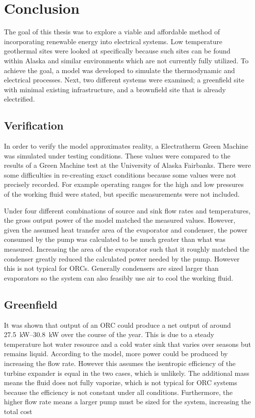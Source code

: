 \chapter{Conclusion}
\label{ch:conclusion}

The goal of this thesis was to explore a viable and affordable method of incorporating renewable energy into electrical systems. Low temperature geothermal sites were looked at specifically because such sites can be found within Alaska and similar environments which are not currently fully utilized. To achieve the goal, a model was developed to simulate the thermodynamic and electrical processes. Next, two different systems were examined; a greenfield site with minimal existing infrastructure, and a brownfield site that is already electrified. 

\section{Verification}
In order to verify the model approximates reality, a Electratherm Green Machine was simulated under testing conditions. These values were compared to the results of a Green Machine test at the University of Alaska Fairbanks. There were some difficulties in re-creating exact conditions because some values were not precisely recorded. For example operating ranges for the high and low pressures of the working fluid were stated, but specific measurements were not included.

Under four different combinations of source and sink flow rates and temperatures, the gross output power of the model matched the measured values. However, given the assumed heat transfer area of the evaporator and condenser, the power consumed by the pump was calculated to be much greater than what was measured. Increasing the area of the evaporator such that it roughly matched the condenser greatly reduced the calculated power needed by the pump. However this is not typical for ORCs. Generally condensers are sized larger than evaporators so the system can also feasibly use air to cool the working fluid. 

\section{Greenfield}
It was shown that output of an ORC could produce a net output of around \SIrange{27.5}{30.8}{\kilo\watt} over the course of the year. This is due to a steady temperature hot water resource and a cold water sink that varies over seasons but remains liquid. According to the model, more power could be produced by increasing the flow rate. However this assumes the isentropic efficiency of the turbine expander is equal in the two cases, which is unlikely. The additional mass means the fluid does not fully vaporize, which is not typical for ORC systems because the efficiency is not constant under all conditions. Furthermore, the higher flow rate means a larger pump must be sized for the system, increasing the total cost

